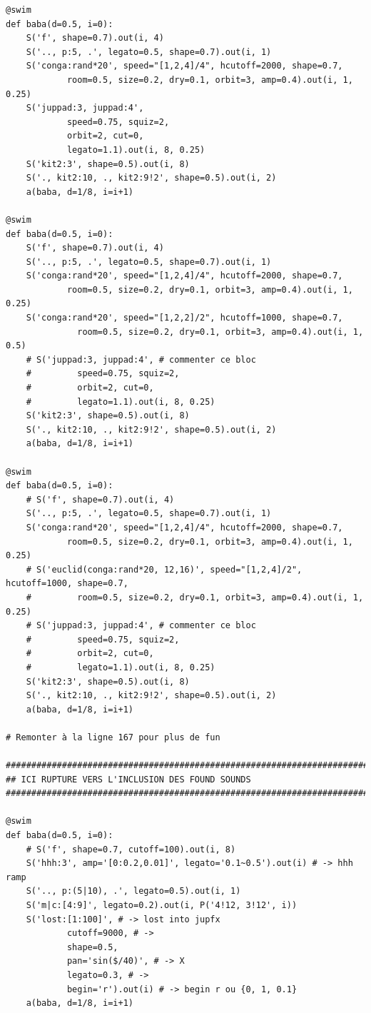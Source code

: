 \documentclass[11pt]{article}
\begin{document}
\begin{enumerate}
\begin{verbatim}
@swim
def baba(d=0.5, i=0):
    S('f', shape=0.7).out(i, 4)
    S('.., p:5, .', legato=0.5, shape=0.7).out(i, 1)
    S('conga:rand*20', speed="[1,2,4]/4", hcutoff=2000, shape=0.7,
            room=0.5, size=0.2, dry=0.1, orbit=3, amp=0.4).out(i, 1, 0.25)
    S('juppad:3, juppad:4',
            speed=0.75, squiz=2,
            orbit=2, cut=0,
            legato=1.1).out(i, 8, 0.25)
    S('kit2:3', shape=0.5).out(i, 8)
    S('., kit2:10, ., kit2:9!2', shape=0.5).out(i, 2)
    a(baba, d=1/8, i=i+1)

@swim
def baba(d=0.5, i=0):
    S('f', shape=0.7).out(i, 4)
    S('.., p:5, .', legato=0.5, shape=0.7).out(i, 1)
    S('conga:rand*20', speed="[1,2,4]/4", hcutoff=2000, shape=0.7,
            room=0.5, size=0.2, dry=0.1, orbit=3, amp=0.4).out(i, 1, 0.25)
    S('conga:rand*20', speed="[1,2,2]/2", hcutoff=1000, shape=0.7,
              room=0.5, size=0.2, dry=0.1, orbit=3, amp=0.4).out(i, 1, 0.5)
    # S('juppad:3, juppad:4', # commenter ce bloc
    #         speed=0.75, squiz=2,
    #         orbit=2, cut=0,
    #         legato=1.1).out(i, 8, 0.25)
    S('kit2:3', shape=0.5).out(i, 8)
    S('., kit2:10, ., kit2:9!2', shape=0.5).out(i, 2)
    a(baba, d=1/8, i=i+1)

@swim
def baba(d=0.5, i=0):
    # S('f', shape=0.7).out(i, 4)
    S('.., p:5, .', legato=0.5, shape=0.7).out(i, 1)
    S('conga:rand*20', speed="[1,2,4]/4", hcutoff=2000, shape=0.7,
            room=0.5, size=0.2, dry=0.1, orbit=3, amp=0.4).out(i, 1, 0.25)
    # S('euclid(conga:rand*20, 12,16)', speed="[1,2,4]/2", hcutoff=1000, shape=0.7,
    #         room=0.5, size=0.2, dry=0.1, orbit=3, amp=0.4).out(i, 1, 0.25)
    # S('juppad:3, juppad:4', # commenter ce bloc
    #         speed=0.75, squiz=2,
    #         orbit=2, cut=0,
    #         legato=1.1).out(i, 8, 0.25)
    S('kit2:3', shape=0.5).out(i, 8)
    S('., kit2:10, ., kit2:9!2', shape=0.5).out(i, 2)
    a(baba, d=1/8, i=i+1)

# Remonter à la ligne 167 pour plus de fun

#############################################################################
## ICI RUPTURE VERS L'INCLUSION DES FOUND SOUNDS
#############################################################################

@swim
def baba(d=0.5, i=0):
    # S('f', shape=0.7, cutoff=100).out(i, 8)
    S('hhh:3', amp='[0:0.2,0.01]', legato='0.1~0.5').out(i) # -> hhh ramp
    S('.., p:(5|10), .', legato=0.5).out(i, 1)
    S('m|c:[4:9]', legato=0.2).out(i, P('4!12, 3!12', i))
    S('lost:[1:100]', # -> lost into jupfx
            cutoff=9000, # ->
            shape=0.5,
            pan='sin($/40)', # -> X
            legato=0.3, # ->
            begin='r').out(i) # -> begin r ou {0, 1, 0.1}
    a(baba, d=1/8, i=i+1)


\end{verbatim}
\end{enumerate}
\end{document}
